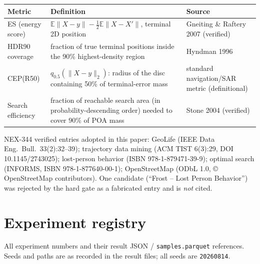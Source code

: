 \documentclass[11pt]{article}
\begin{document}
\begin{center}
\begin{tabular}{p{3.0cm}p{5.0cm}p{2.5cm}}
\toprule
Metric & Definition & Source \\
\midrule
ES (energy score) & $\mathbb{E}\|X-y\|-\tfrac12\mathbb{E}\|X-X'\|$,
terminal 2D position & Gneiting \& Raftery 2007 (verified) \\
HDR90 coverage & fraction of true terminal positions inside the 90\%
highest-density region & Hyndman 1996 \\
CEP(R50) & $q_{0.5}(\|X-y\|_2)$: radius of the disc containing 50\% of
terminal-error mass & standard navigation/SAR metric (definitional) \\
Search efficiency & fraction of reachable search area (in
probability-descending order) needed to cover 90\% of POA mass & Stone 2004
(verified) \\
\bottomrule
\end{tabular}
\end{center}

\noindent NEX-344 verified entries adopted in this paper:
GeoLife \cite{zheng2010geolife} (IEEE Data Eng.\ Bull.\ 33(2):32--39);
trajectory data mining \cite{zheng2015trajectory} (ACM TIST 6(3):29,
DOI 10.1145/2743025); lost-person behavior \cite{koester2008} (ISBN
978-1-879471-39-9); optimal search \cite{stone2004} (INFORMS, ISBN
978-1-877640-00-1); OpenStreetMap \cite{osm2026} (ODbL 1.0, \copyright{}
OpenStreetMap contributors).  One candidate (``Frost -- Lost Person
Behavior'') was rejected by the hard gate as a fabricated entry and is
\emph{not} cited.

\section{Experiment registry}
\label{app:registry}
All experiment numbers and their result JSON / \texttt{samples.parquet}
references.  Seeds and paths are as recorded in the result files; all
seeds are \texttt{20260814}.
\end{document}
